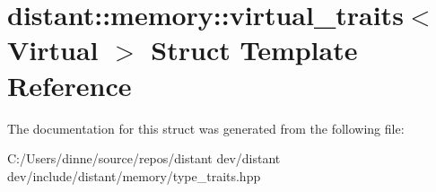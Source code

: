 \hypertarget{structdistant_1_1memory_1_1virtual__traits}{}\section{distant\+:\+:memory\+:\+:virtual\+\_\+traits$<$ Virtual $>$ Struct Template Reference}
\label{structdistant_1_1memory_1_1virtual__traits}


The documentation for this struct was generated from the following file\+:\begin{DoxyCompactItemize}
\item 
C\+:/\+Users/dinne/source/repos/distant dev/distant dev/include/distant/memory/type\+\_\+traits.\+hpp\end{DoxyCompactItemize}
